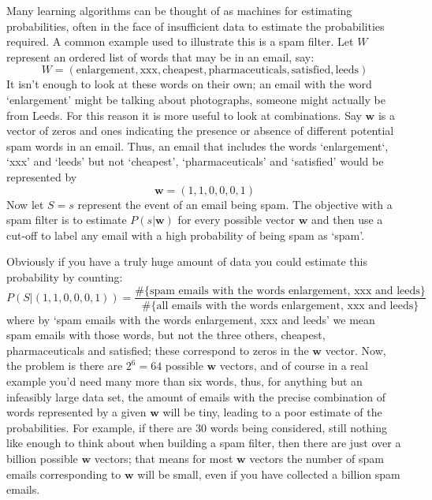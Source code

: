 \documentclass[12pt]{article}
\begin{document}
Many learning algorithms can be thought of as machines for
estimating probabilities, often in the face of insufficient data to
estimate the probabilities required. A common example used to
illustrate this is a spam filter. Let $W$ represent an ordered list of
words that may be in an email, say:
\begin{equation}
W=(\mbox{enlargement},\mbox{xxx},\mbox{cheapest},\mbox{pharmaceuticals}, \mbox{satisfied},\mbox{leeds})
\end{equation}
It isn't enough to look at these words on their own; an email with the
word \lq{}enlargement\rq{} might be talking about photographs, someone
might actually be from Leeds. For this reason it is more useful to
look at combinations. Say $\textbf{w}$ is a vector of zeros and ones
indicating the presence or absence of different potential spam words
in an email. Thus, an email that includes the words
\lq{}enlargement\lq{}, \lq{}xxx\rq{} and \lq{}leeds\rq{} but not
\lq{}cheapest\rq{}, \lq{}pharmaceuticals\rq{} and \lq{}satisfied\rq{}
would be represented by
\begin{equation}
\textbf{w}=(1,1,0,0,0,1)
\end{equation}
Now let $S=s$ represent the event of an email being spam. The objective
with a spam filter is to estimate $P(s|\textbf{w})$ for every possible
vector $\textbf{w}$ and then use a cut-off to label any email with a
high probability of being spam as \lq{}spam\rq{}.

Obviously if you have a truly huge amount of data you could estimate this probability by counting:
\begin{equation}
P(S|(1,1,0,0,0,1))=\frac{\#\{\mbox{spam emails with the words enlargement, xxx and leeds}\}}{\#\{\mbox{all emails with the words enlargement, xxx and leeds}\}}
\end{equation}
where by \lq{}spam emails with the words enlargement, xxx and
leeds\rq{} we mean spam emails with those words, but not the three
others, cheapest, pharmaceuticals and satisfied; these correspond to
zeros in the $\textbf{w}$ vector. Now, the problem is there are
$2^6=64$ possible $\textbf{w}$ vectors, and of course in a real
example you'd need many more than six words, thus, for anything but an
infeasibly large data set, the amount of emails with the precise
combination of words represented by a given $\textbf{w}$ will be tiny,
leading to a poor estimate of the probabilities. For example, if there
are 30 words being considered, still nothing like enough to think
about when building a spam filter, then there are just over a billion
possible $\textbf{w}$ vectors; that means for most $\textbf{w}$
vectors the number of spam emails corresponding to $\textbf{w}$ will
be small, even if you have collected a billion spam emails.
\end{document}
